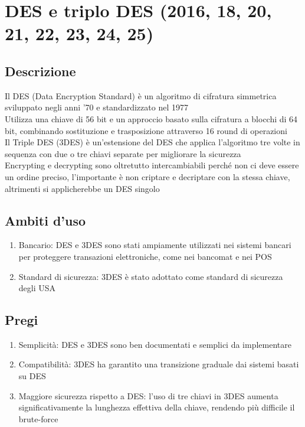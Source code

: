 \documentclass[10pt,oneside,a4paper]{article}
\begin{document}
\section{DES e triplo DES (2016, 18, 20, 21, 22, 23, 24, 25)}
\subsection{Descrizione}
Il DES (Data Encryption Standard) è un algoritmo di cifratura simmetrica sviluppato negli anni '70 e standardizzato nel 1977\\
Utilizza una chiave di 56 bit e un approccio basato sulla cifratura a blocchi di 64 bit, combinando sostituzione e trasposizione attraverso 16 round di operazioni\\
Il Triple DES (3DES) è un'estensione del DES che applica l'algoritmo tre volte in sequenza con due o tre chiavi separate per migliorare la sicurezza\\
Encrypting e decrypting sono oltretutto intercambiabili perché non ci deve essere un ordine preciso, l'importante è non criptare e decriptare con la stessa chiave, altrimenti si applicherebbe un DES singolo
\subsection{Ambiti d'uso}
\begin{enumerate}
\item Bancario: DES e 3DES sono stati ampiamente utilizzati nei sistemi bancari per proteggere transazioni elettroniche, come nei bancomat e nei POS
\item Standard di sicurezza: 3DES è stato adottato come standard di sicurezza degli USA
\end{enumerate}
\subsection{Pregi}
\begin{enumerate}
\item Semplicità: DES e 3DES sono ben documentati e semplici da implementare
\item Compatibilità: 3DES ha garantito una transizione graduale dai sistemi basati su DES
\item Maggiore sicurezza rispetto a DES: l'uso di tre chiavi in 3DES aumenta significativamente la lunghezza effettiva della chiave, rendendo più difficile il brute-force
\end{enumerate}
\end{document}
